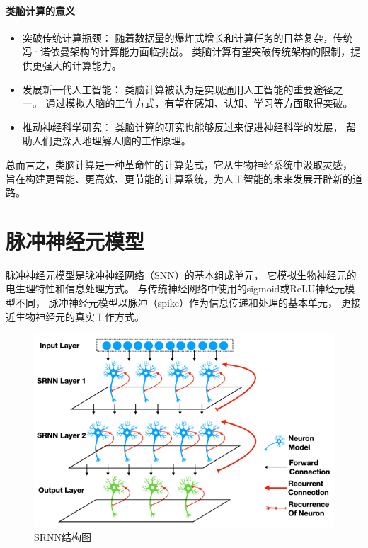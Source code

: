 \documentclass[12pt, a4paper, oneside]{ctexart}
\numberwithin{equation}{section}  %
\begin{document}
\paragraph{类脑计算的意义}
\begin{itemize}
    \item 突破传统计算瓶颈： 随着数据量的爆炸式增长和计算任务的日益复杂，传统冯·诺依曼架构的计算能力面临挑战。
    类脑计算有望突破传统架构的限制，提供更强大的计算能力。
    \item 发展新一代人工智能： 类脑计算被认为是实现通用人工智能的重要途径之一。
    通过模拟人脑的工作方式，有望在感知、认知、学习等方面取得突破。
    \item 推动神经科学研究： 类脑计算的研究也能够反过来促进神经科学的发展，
    帮助人们更深入地理解人脑的工作原理。
\end{itemize}

总而言之，类脑计算是一种革命性的计算范式，它从生物神经系统中汲取灵感，
旨在构建更智能、更高效、更节能的计算系统，为人工智能的未来发展开辟新的道路。

\section{脉冲神经元模型}
脉冲神经元模型是脉冲神经网络（SNN）的基本组成单元，
它模拟生物神经元的电生理特性和信息处理方式。
与传统神经网络中使用的sigmoid或ReLU神经元模型不同，
脉冲神经元模型以脉冲（spike）作为信息传递和处理的基本单元，
更接近生物神经元的真实工作方式\cite{ref2,ref3}。
\begin{figure}[htbp]
    \centering
    \includegraphics[width=\linewidth]{2.png}
    \caption{SRNN结构图}
\end{figure}
\end{document}
